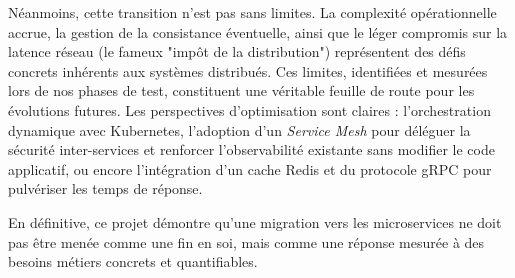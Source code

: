 \vspace{0.3cm}

Néanmoins, cette transition n'est pas sans limites. La complexité opérationnelle accrue, la gestion de la consistance éventuelle, ainsi que le léger compromis sur la latence réseau (le fameux "impôt de la distribution") représentent des défis concrets inhérents aux systèmes distribués. Ces limites, identifiées et mesurées lors de nos phases de test, constituent une véritable feuille de route pour les évolutions futures. Les perspectives d'optimisation sont claires : l'orchestration dynamique avec Kubernetes, l'adoption d'un \textit{Service Mesh} pour déléguer la sécurité inter-services et renforcer l'observabilité existante sans modifier le code applicatif, ou encore l'intégration d'un cache Redis et du protocole gRPC pour pulvériser les temps de réponse.

\vspace{0.3cm}

En définitive, ce projet démontre qu'une migration vers les microservices ne doit pas être menée comme une fin en soi, mais comme une réponse mesurée à des besoins métiers concrets et quantifiables. 
